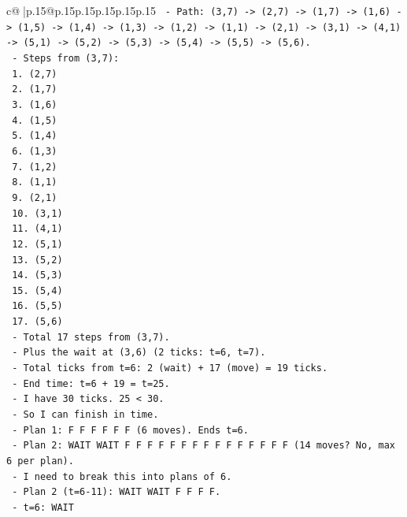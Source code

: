 \documentclass{article}
\begin{document}
{\begin{supertabular}{c@{$\;$}|p{.15\linewidth}@{}p{.15\linewidth}p{.15\linewidth}p{.15\linewidth}p{.15\linewidth}p{.15\linewidth}}
{{{\texttt{       {-} Path: (3,7) {-}> (2,7) {-}> (1,7) {-}> (1,6) {-}> (1,5) {-}> (1,4) {-}> (1,3) {-}> (1,2) {-}> (1,1) {-}> (2,1) {-}> (3,1) {-}> (4,1) {-}> (5,1) {-}> (5,2) {-}> (5,3) {-}> (5,4) {-}> (5,5) {-}> (5,6).} \\
\texttt{       {-} Steps from (3,7):} \\
\texttt{         1. (2,7)} \\
\texttt{         2. (1,7)} \\
\texttt{         3. (1,6)} \\
\texttt{         4. (1,5)} \\
\texttt{         5. (1,4)} \\
\texttt{         6. (1,3)} \\
\texttt{         7. (1,2)} \\
\texttt{         8. (1,1)} \\
\texttt{         9. (2,1)} \\
\texttt{         10. (3,1)} \\
\texttt{         11. (4,1)} \\
\texttt{         12. (5,1)} \\
\texttt{         13. (5,2)} \\
\texttt{         14. (5,3)} \\
\texttt{         15. (5,4)} \\
\texttt{         16. (5,5)} \\
\texttt{         17. (5,6)} \\
\texttt{       {-} Total 17 steps from (3,7).} \\
\texttt{       {-} Plus the wait at (3,6) (2 ticks: t=6, t=7).} \\
\texttt{       {-} Total ticks from t=6: 2 (wait) + 17 (move) = 19 ticks.} \\
\texttt{       {-} End time: t=6 + 19 = t=25.} \\
\texttt{       {-} I have 30 ticks. 25 < 30.} \\
\texttt{       {-} So I can finish in time.} \\
\texttt{       {-} Plan 1: F F F F F F (6 moves). Ends t=6.} \\
\texttt{       {-} Plan 2: WAIT WAIT F F F F F F F F F F F F F F F (14 moves? No, max 6 per plan).} \\
\texttt{       {-} I need to break this into plans of 6.} \\
\texttt{       {-} Plan 2 (t=6{-}11): WAIT WAIT F F F F.} \\
\texttt{         {-} t=6: WAIT} \\
}}}
\end{supertabular}}
\end{document}
